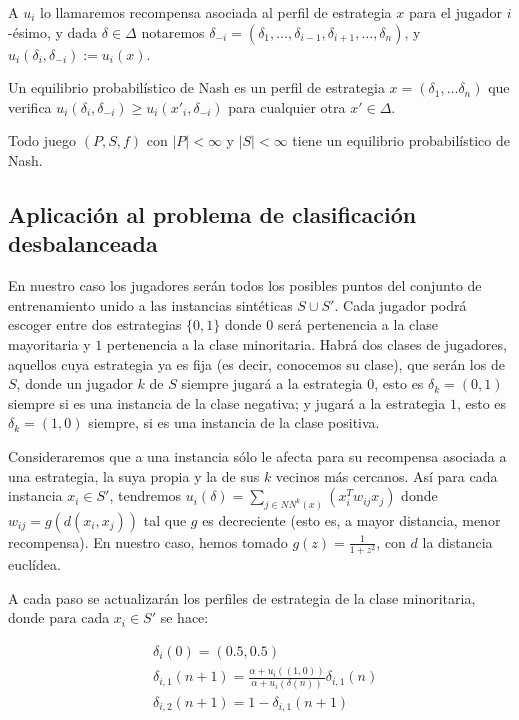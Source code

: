 A $u_i$ lo llamaremos recompensa asociada al perfil de estrategia $x$ para el jugador $i$-ésimo, y dada $\delta\in \Delta$ notaremos
$\delta_{-i} = (\delta_1, \ldots, \delta_{i-1}, \delta_{i+1}, \ldots, \delta_n)$, y $u_i(\delta_i, \delta_{-i}):= u_i(x)$.

\begin{definition}
Un equilibrio probabilístico de Nash es un perfil de estrategia $x = (\delta_1, \ldots \delta_n)$ que verifica 
$u_i(\delta_i, \delta_{-i}) \ge u_i(x'_{i}, \delta_{-i})$ para cualquier otra $x'\in \Delta$.
\end{definition}

\begin{theorem}
 Todo juego $(P,S,f)$ con $|P| < \infty$ y $|S| < \infty$ tiene un equilibrio probabilístico de Nash.
\end{theorem}

\subsection{Aplicación al problema de clasificación desbalanceada}
En nuestro caso los jugadores serán todos los posibles puntos del conjunto de entrenamiento unido a las instancias 
sintéticas $S \cup S'$. Cada jugador podrá escoger entre dos estrategias $\{0,1\}$ donde $0$ será pertenencia a la clase 
mayoritaria y $1$ pertenencia a la clase minoritaria. Habrá dos clases de jugadores, aquellos cuya estrategia ya es fija (es
decir, conocemos su clase), que serán los de $S$, donde un jugador $k$ de $S$ siempre jugará a la estrategia $0$, esto es 
$\delta_k = (0,1)$ siempre si es una instancia de la clase negativa; y jugará a la estrategia $1$, esto es 
$\delta_k = (1,0)$ siempre, si es una instancia de la clase positiva.

Consideraremos que a una instancia sólo le afecta para su recompensa asociada a una estrategia, la suya propia y la de sus
$k$ vecinos más cercanos. Así para cada instancia $x_i \in S'$, tendremos $u_i(\delta) = \sum_{j\in NN^k(x)} (x_i^T w_{ij} x_j)$ donde
$w_{ij} = g\left(d(x_i, x_j)\right)$ tal que $g$ es decreciente (esto es, a mayor distancia, menor recompensa). En nuestro
caso, hemos tomado $g(z) = \frac{1}{1+z^2}$, con $d$ la distancia euclídea.

A cada paso se actualizarán los perfiles de estrategia de la clase minoritaria, donde para cada $x_i\in S'$ se hace: 

\begin{align*}
& \delta_i(0) = (0.5, 0.5)\\
& \delta_{i,1}(n+1) = \frac{\alpha + u_i((1,0))}{\alpha + u_i(\delta(n))} \delta_{i,1}(n)\\
& \delta_{i,2}(n+1) = 1 - \delta_{i,1}(n+1)
\end{align*}

